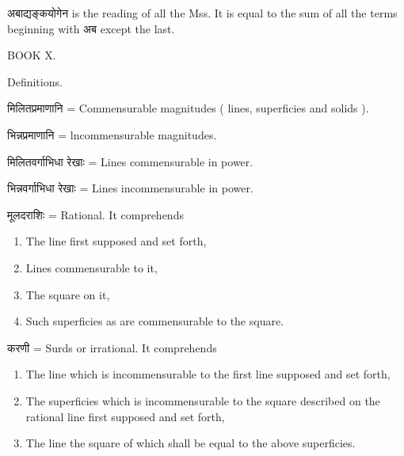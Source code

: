 \documentclass[11pt, openany]{book}
\begin{document}
\newpage
{}

 अबाद्यङ्कयोगेन {\en is the reading of all the Mss. It is equal to the sum of all the terms beginning with अब except the last.}\\

\begin{center}
\vspace{1mm}

BOOK X.
\vspace{2mm}

Definitions.
\end{center}

मिलितप्रमाणानि = {\en Commensurable magnitudes ( lines, superficies and solids ).}

भिन्नप्रमाणानि = {\en lncommensurable magnitudes.}

मिलितवर्गाभिधा रेखाः = {\en Lines commensurable in power.}

भिन्नवर्गाभिधा रेखाः = {\en Lines incommensurable in power.}

मूलदराशिः = {\en Rational. It comprehends}

\begin{enumerate}[itemsep=1pt,parsep=2pt]
\item {\en The line first supposed and set forth,}
\item {\en Lines commensurable to it,}
\item {\en The square on it,}
\item {\en Such superficies as are commensurable to the square.} 
\end{enumerate}

करणी = {\en Surds or irrational. It comprehends}

\begin{enumerate}[itemsep=1pt,parsep=2pt]
\item {\en The line which is incommensurable to the first line supposed and set forth,}
\item {\en The superficies which is incommensurable to the square described on the rational line first supposed and set forth,}
\item {\en The line the square of which shall be equal to the above superficies.}
\end{enumerate}
\end{document}
